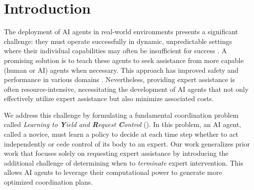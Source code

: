 \section{Introduction}\label{sec:introduction}

The deployment of AI agents in real-world environments presents a significant challenge: they must operate successfully in dynamic, unpredictable settings where their individual capabilities may often be insufficient for success \citep{amodei2016concrete, leike2017ai,zhou2024hazard}. 
A promising solution is to teach these agents to seek assistance from more capable (human or AI) agents when necessary. 
This approach has improved safety and performance in various domains  \citep{sadigh2016planning,reddy2018shared, nguyen2021learning}. 
Nevertheless, providing expert assistance is often resource-intensive, necessitating the development of AI agents that not only effectively utilize expert assistance but also minimize associated costs. 

We address this challenge by formulating a fundamental coordination problem called \textit{Learning to \textbf{Y}ield and \textbf{R}equest \textbf{C}ontrol} (\ourMethod).
In this problem, an AI agent, called a novice, must learn a policy to decide at each time step whether to act independently or cede control of its body to an expert. Our work generalizes prior work that focuses solely on requesting expert assistance \citep{nguyen-daume-iii-2019-help,Nguyen_2019_CVPR,shi2022learning,singh2022ask4help,liu2022asking,knowno2023} by introducing the additional challenge of determining when to \textit{terminate} expert intervention.
This allows AI agents to leverage their computational power to generate more optimized coordination plans.





